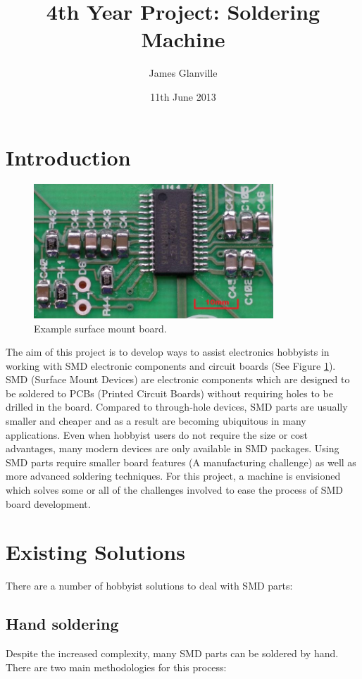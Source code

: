 \documentclass[a4paper,11pt]{article}  %
\title{4th Year Project: Soldering Machine}
\author{James Glanville}
\date{11th June 2013}
\begin{document}
\maketitle


\tableofcontents

\newpage

\section{Introduction}

\begin{figure}[ht!]
\centering
\includegraphics[width=90mm]{resources/smt_soldering.jpg}
\caption{Example surface mount board.}
\label{smdexample}
\end{figure}

The aim of this project is to develop ways to assist electronics hobbyists in working with SMD electronic components
and circuit boards (See Figure \ref{smdexample}). SMD (Surface Mount Devices) are electronic components which are designed to be soldered to PCBs
(Printed Circuit Boards) without requiring holes to be drilled in the board. Compared to through-hole devices, SMD parts 
are usually smaller and cheaper and as a result are becoming ubiquitous in many applications. Even when hobbyist users do
not require the size or cost advantages, many modern devices are only available in SMD packages. Using SMD parts require
smaller board features (A manufacturing challenge) as well as more advanced soldering techniques. For this project, a machine
is envisioned which solves some or all of the challenges involved to ease the process of SMD board development.

\section{Existing Solutions}
There are a number of hobbyist solutions to deal with SMD parts:

\subsection{Hand soldering}
Despite the increased complexity, many SMD parts can be soldered by hand. There are two main methodologies for this process:
\end{document}
